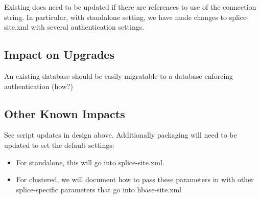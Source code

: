 \documentclass{article}
\begin{document}
Existing docs need to be updated if there are references to use of the connection string. In particular, with standalone setting, we have made changes 
to splice-site.xml with several authentication settings. 

\subsection{Impact on Upgrades}

An existing database should be easily migratable to a database enforcing authentication (how?)

\subsection{Other Known Impacts}

See script updates in design above.  Additionally packaging will need to be updated to set the default settings:
\begin{itemize}
\item For standalone, this will go into splice-site.xml.
\item For clustered, we will document how to pass these parameters in with other splice-specific parameters that go into hbase-site.xml
\end{itemize}
 
\end{document}
